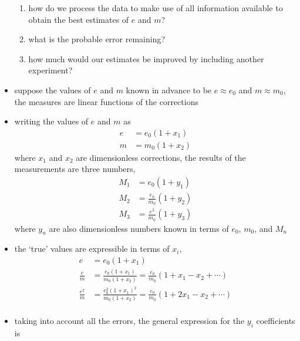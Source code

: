 \documentclass[../jaynes_prob_theory_notes.tex]{subfiles}
\begin{document}
\begin{itemize}
                    \begin{enumerate}
                        \item how do we process the data to make use of all information available to obtain the best estimates of \(e\) and \(m\)?
                        \item what is the probable error remaining?
                        \item how much would our estimates be improved by including another experiment?
                    \end{enumerate}
                \item suppose the values of \(e\) and \(m\) known in advance to be \(e \approx e_0\) and \(m \approx m_0\), the measures are linear functions of the corrections
                \item writing the values of \(e\) and \(m\) as 
                    \begin{align*} 
                        e &= e_0 (1 + x_1) \\
                        m &= m_0 (1 + x_2)
                    \end{align*}
                    where \(x_1\) and \(x_2\) are dimensionless corrections, the results of the measurements are three numbers,
                    \begin{align*} 
                        M_1 &= e_0 (1 + y_1) \\
                        M_2 &= \frac{e_0}{m_0} (1 + y_2) \\
                        M_3 &= \frac{e^2}{m_0} (1 + y_3)
                    \end{align*}
                    where \(y_n\) are also dimensionless numbers known in terms of \(e_0\), \(m_0\), and \(M_n\)
                \item the `true' values are expressible in terms of \(x_i\),
                    \begin{align*} 
                        e &= e_0 ( 1 + x_1) \\
                        \frac{e}{m} &= \frac{e_0 (1 + x_1)}{m_0 (1 + x_2)} = \frac{e_0}{m_0} (1 + x_1 - x_2 + \cdots) \\
                        \frac{e^2}{m} &= \frac{e^2_0 {(1 + x_1)}^2}{m_0 (1 + x_2)} = \frac{e_0}{m_0} (1 + 2x_1 - x_2 + \cdots) \\
                    \end{align*}
                \item taking into account all the errors, the general expression for the \(y_i\) coefficients is 

\end{itemize}
\end{document}

